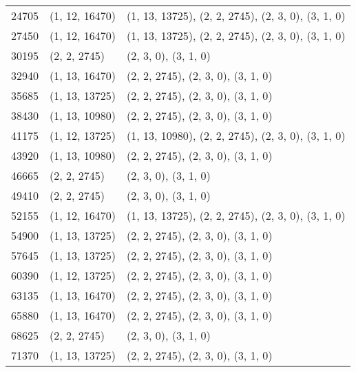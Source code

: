 \begin{longtable}{@{\extracolsep{\fill}}lll}
	24705              & (1, 12, 16470)              & (1, 13, 13725), (2, 2, 2745), (2, 3, 0), (3, 1, 0)  \\
	27450              & (1, 12, 16470)              & (1, 13, 13725), (2, 2, 2745), (2, 3, 0), (3, 1, 0)  \\
	30195              & (2, 2, 2745)                & (2, 3, 0), (3, 1, 0)                                \\
	32940              & (1, 13, 16470)              & (2, 2, 2745), (2, 3, 0), (3, 1, 0)                  \\
	35685              & (1, 13, 13725)              & (2, 2, 2745), (2, 3, 0), (3, 1, 0)                  \\
	38430              & (1, 13, 10980)              & (2, 2, 2745), (2, 3, 0), (3, 1, 0)                  \\
	41175              & (1, 12, 13725)              & (1, 13, 10980), (2, 2, 2745), (2, 3, 0), (3, 1, 0)  \\
	43920              & (1, 13, 10980)              & (2, 2, 2745), (2, 3, 0), (3, 1, 0)                  \\
	46665              & (2, 2, 2745)                & (2, 3, 0), (3, 1, 0)                                \\
	49410              & (2, 2, 2745)                & (2, 3, 0), (3, 1, 0)                                \\
	52155              & (1, 12, 16470)              & (1, 13, 13725), (2, 2, 2745), (2, 3, 0), (3, 1, 0)  \\
	54900              & (1, 13, 13725)              & (2, 2, 2745), (2, 3, 0), (3, 1, 0)                  \\
	57645              & (1, 13, 13725)              & (2, 2, 2745), (2, 3, 0), (3, 1, 0)                  \\
	60390              & (1, 12, 13725)              & (2, 2, 2745), (2, 3, 0), (3, 1, 0)                  \\
	63135              & (1, 13, 16470)              & (2, 2, 2745), (2, 3, 0), (3, 1, 0)                  \\
	65880              & (1, 13, 16470)              & (2, 2, 2745), (2, 3, 0), (3, 1, 0)                  \\
	68625              & (2, 2, 2745)                & (2, 3, 0), (3, 1, 0)                                \\
	71370              & (1, 13, 13725)              & (2, 2, 2745), (2, 3, 0), (3, 1, 0)                  \\

\end{longtable}
